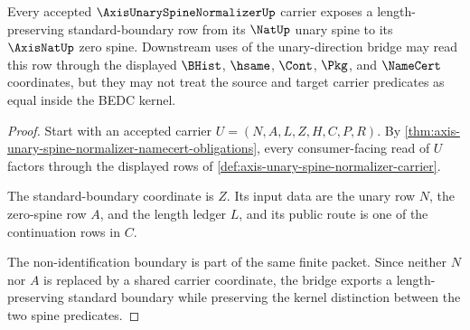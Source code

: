 \begin{theorem}
\label{thm:axis-unary-spine-normalizer-standard-boundary}
Every accepted $\AxisUnarySpineNormalizerUp$ carrier exposes a length-preserving standard-boundary row from its $\NatUp$ unary spine to its $\AxisNatUp$ zero spine. Downstream uses of the unary-direction bridge may read this row through the displayed $\BHist$, $\hsame$, $\Cont$, $\Pkg$, and $\NameCert$ coordinates, but they may not treat the source and target carrier predicates as equal inside the BEDC kernel.
\end{theorem}
\begin{proof}
Start with an accepted carrier $U=(N,A,L,Z,H,C,P,R)$. By \autoref{thm:axis-unary-spine-normalizer-namecert-obligations}, every consumer-facing read of $U$ factors through the displayed rows of \autoref{def:axis-unary-spine-normalizer-carrier}.

The standard-boundary coordinate is $Z$. Its input data are the unary row $N$, the zero-spine row $A$, and the length ledger $L$, and its public route is one of the continuation rows in $C$.

The non-identification boundary is part of the same finite packet. Since neither $N$ nor $A$ is replaced by a shared carrier coordinate, the bridge exports a length-preserving standard boundary while preserving the kernel distinction between the two spine predicates.
\end{proof}

